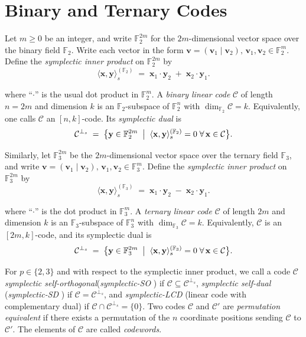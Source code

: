 \documentclass[11pt,a4paper]{article}
\theoremstyle{definition}
\numberwithin{equation}{section}
\newcommand{\F}{\mathbb{F}}
\def\C{{\mathcal{C}}}
\begin{document}
\section{Binary and Ternary Codes}\label{sec:1} 

Let \(m \ge 0\) be an integer, and write \(\mathbb{F}_2^{2m}\) for the \(2m\)-dimensional vector space over the binary field \(\mathbb{F}_2\). Write each vector in the form $\mathbf{v} = (\mathbf{v}_1 \mid \mathbf{v}_2),\, \mathbf{v}_1,\mathbf{v}_2\in\F_2^m.$
Define the \emph{symplectic inner product} on \(\F_2^{2m}\) by
\begin{equation}
\langle \mathbf{x}, \mathbf{y} \rangle_s^{(\F_2)}
\;=\;
\mathbf{x}_1 \cdot \mathbf{y}_2
\;+\;
\mathbf{x}_2 \cdot \mathbf{y}_1.
\end{equation}

where “\(\cdot\)” is the usual dot product in \(\F_2^m\).  A \emph{binary linear code} \(\C\) of length \(n=2m\) and dimension \(k\) is an \(\F_2\)-subspace of \(\F_2^n\) with \(\dim_{\F_2}\C=k\).  Equivalently, one calls \(\C\) an \([n,k]\)-code.  Its \emph{symplectic dual} is
\[
\C^{\perp_s}
\;=\;
\bigl\{
\mathbf{y}\in\F_2^{2m}
\;\bigm|\;
\langle \mathbf{x},\mathbf{y}\rangle_s^{(\F_2)}=0
\;\forall\,\mathbf{x}\in\C
\bigr\}.
\]

Similarly, let \(\F_3^{2m}\) be the \(2m\)-dimensional vector space over the ternary field \(\F_3\), and write $\mathbf{v} = (\mathbf{v}_1 \mid \mathbf{v}_2),\,\mathbf{v}_1,\mathbf{v}_2\in\F_3^m.$
Define the \emph{symplectic inner product} on \(\F_3^{2m}\) by
\begin{equation}
\langle \mathbf{x}, \mathbf{y} \rangle_s^{(\F_3)}
\;=\;
\mathbf{x}_1 \cdot \mathbf{y}_2
\;-\;
\mathbf{x}_2 \cdot \mathbf{y}_1.
\end{equation}

where “\(\cdot\)” is the dot product in \(\F_3^m\).  A \emph{ternary linear code} \(\C\) of length \(2m\) and dimension \(k\) is an \(\F_3\)-subspace of \(\F_3^n\) with \(\dim_{\F_3}\C=k\).  Equivalently, \(\C\) is an \([2m,k]\)-code, and its symplectic dual is
\[
\C^{\perp_s}
\;=\;
\bigl\{
\mathbf{y}\in\F_3^{2m}
\;\bigm|\;
\langle \mathbf{x},\mathbf{y}\rangle_s^{(\F_3)}=0
\;\forall\,\mathbf{x}\in\C
\bigr\}.
\]

For \(p\in\{2,3\}\) and with respect to the symplectic inner product, we call a code \(\C\) \emph{symplectic self-orthogonal}(\emph{symplectic-SO} ) if \(\C\subseteq \C^{\perp_s}\), \emph{symplectic self-dual} (\emph{symplectic-SD} ) if \(\C=\C^{\perp_s}\), and \emph{symplectic-LCD} (linear code with complementary dual) if \(\C\cap \C^{\perp_s}=\{0\}\). Two codes \(\C\) and \(\C'\) are \emph{permutation equivalent} if there exists a permutation of the \(n\) coordinate positions sending \(\C\) to \(\C'\). The elements of \(\C\) are called \emph{codewords}.
\end{document}
